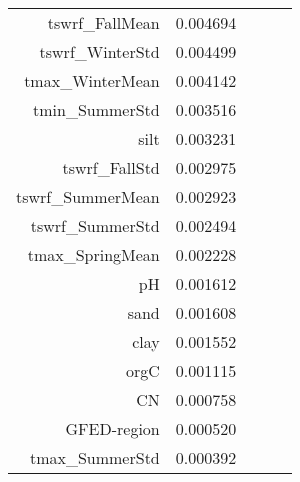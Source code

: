 \begin{tabular}{rrrrr}
tswrf_FallMean & 0.004694 \\
tswrf_WinterStd & 0.004499 \\
tmax_WinterMean & 0.004142 \\
tmin_SummerStd & 0.003516 \\
silt & 0.003231 \\
tswrf_FallStd & 0.002975 \\
tswrf_SummerMean & 0.002923 \\
tswrf_SummerStd & 0.002494 \\
tmax_SpringMean & 0.002228 \\
pH & 0.001612 \\
sand & 0.001608 \\
clay & 0.001552 \\
orgC & 0.001115 \\
CN & 0.000758 \\
GFED-region & 0.000520 \\
tmax_SummerStd & 0.000392 \\
\bottomrule
\end{tabular}
